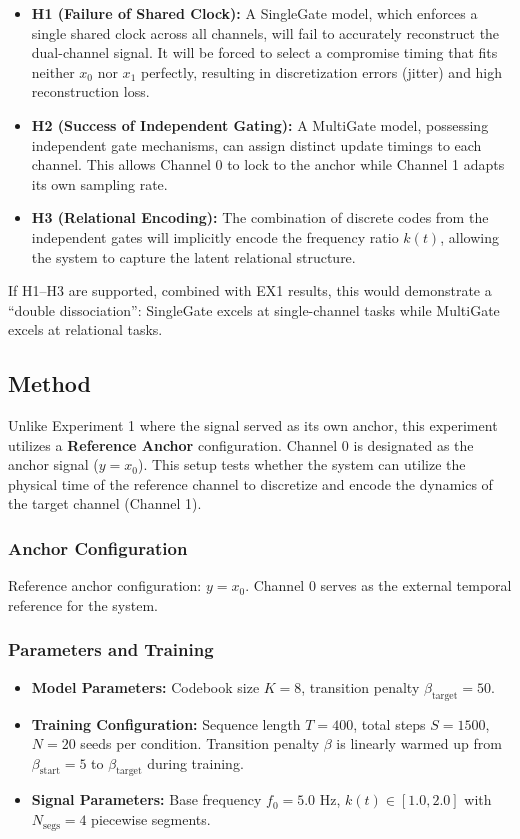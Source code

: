 \documentclass{article}
\begin{document}
\begin{itemize}
    \item \textbf{H1 (Failure of Shared Clock):} A SingleGate model, which enforces a single shared clock across all channels, will fail to accurately reconstruct the dual-channel signal. It will be forced to select a compromise timing that fits neither $x_0$ nor $x_1$ perfectly, resulting in discretization errors (jitter) and high reconstruction loss.
    
    \item \textbf{H2 (Success of Independent Gating):} A MultiGate model, possessing independent gate mechanisms, can assign distinct update timings to each channel. This allows Channel 0 to lock to the anchor while Channel 1 adapts its own sampling rate.
    
    \item \textbf{H3 (Relational Encoding):} The combination of discrete codes from the independent gates will implicitly encode the frequency ratio $k(t)$, allowing the system to capture the latent relational structure.
\end{itemize}

If H1--H3 are supported, combined with EX1 results, this would demonstrate a ``double dissociation'': SingleGate excels at single-channel tasks while MultiGate excels at relational tasks.

\subsection{Method}
Unlike Experiment 1 where the signal served as its own anchor, this experiment utilizes a \textbf{Reference Anchor} configuration. Channel 0 is designated as the anchor signal ($y=x_{0}$). This setup tests whether the system can utilize the physical time of the reference channel to discretize and encode the dynamics of the target channel (Channel 1).

\subsubsection{Anchor Configuration}
Reference anchor configuration: $y = x_0$. Channel 0 serves as the external temporal reference for the system.

\subsubsection{Parameters and Training}
\begin{itemize}
    \item \textbf{Model Parameters:} Codebook size $K=8$, transition penalty $\beta_{\mathrm{target}}=50$.
    \item \textbf{Training Configuration:} Sequence length $T=400$, total steps $S=1500$, $N=20$ seeds per condition. Transition penalty $\beta$ is linearly warmed up from $\beta_{\text{start}}=5$ to $\beta_{\mathrm{target}}$ during training.
    \item \textbf{Signal Parameters:} Base frequency $f_0=5.0$ Hz, $k(t) \in [1.0, 2.0]$ with $N_{\text{segs}}=4$ piecewise segments.
\end{itemize}
\end{document}
